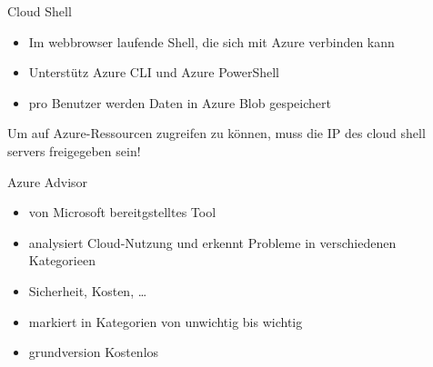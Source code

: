 \begin{flashcard}[Definition]{Cloud Shell}
    \begin{itemize}
        \item Im webbrowser laufende Shell, die sich mit Azure verbinden kann
        \item Unterstütz Azure CLI und Azure PowerShell
        \item pro Benutzer werden Daten in Azure Blob gespeichert
    \end{itemize}

    \vspace{5mm}
    Um auf Azure-Ressourcen zugreifen zu können, muss die IP des cloud shell servers freigegeben sein!
\end{flashcard}

\begin{flashcard}[Describe]{Azure Advisor}
    \begin{itemize}
        \item von Microsoft bereitgstelltes Tool
        \item analysiert Cloud-Nutzung und erkennt Probleme in verschiedenen Kategorieen
        \item Sicherheit, Kosten, \ldots
        \item markiert in Kategorien von unwichtig bis wichtig
        \item grundversion Kostenlos
    \end{itemize}

\end{flashcard}
